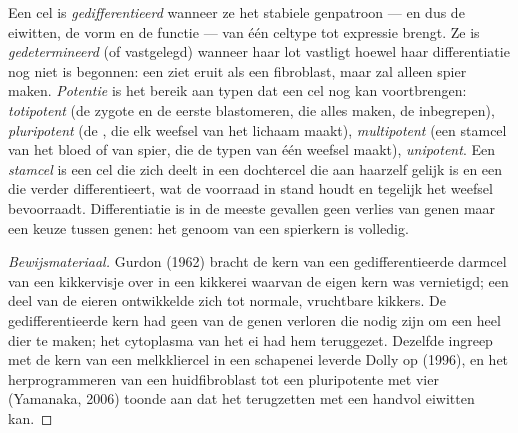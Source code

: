 \begin{definition}\label{def:b2:cell-differentiation:differentiation}
Een cel is \emph{gedifferentieerd} wanneer ze het stabiele genpatroon ---
en dus de eiwitten, de vorm en de functie --- van één celtype tot expressie
brengt. Ze is \emph{gedetermineerd} (of vastgelegd) wanneer haar lot
vastligt hoewel haar differentiatie nog niet is begonnen: een  ziet
eruit als een fibroblast, maar zal alleen spier maken. \emph{Potentie} is
het bereik aan typen dat een cel nog kan voortbrengen: \emph{totipotent}
(de zygote en de eerste blastomeren, die alles maken, de 
inbegrepen), \emph{pluripotent} (de , die elk weefsel van
het lichaam maakt), \emph{multipotent} (een stamcel van het bloed of van
spier, die de typen van één weefsel maakt), \emph{unipotent}. Een
\emph{stamcel} is een cel die zich deelt in een dochtercel die aan haarzelf
gelijk is en een die verder differentieert, wat de voorraad in stand houdt
en tegelijk het weefsel bevoorraadt. Differentiatie is in de meeste gevallen
geen verlies van genen maar een keuze tussen genen: het genoom van een
spierkern is volledig.
\end{definition}
\begin{proof}[Bewijsmateriaal]
Gurdon (1962) bracht de kern van een gedifferentieerde darmcel van een
kikkervisje over in een kikkerei waarvan de eigen kern was vernietigd; een
deel van de eieren ontwikkelde zich tot normale, vruchtbare kikkers. De
gedifferentieerde kern had geen van de genen verloren die nodig zijn om een
heel dier te maken; het cytoplasma van het ei had hem teruggezet. Dezelfde
ingreep met de kern van een melkkliercel in een schapenei leverde Dolly op
(1996), en het herprogrammeren van een huidfibroblast tot een pluripotente
 met vier  (Yamanaka, 2006) toonde aan dat het
terugzetten met een handvol eiwitten kan.
\end{proof}

